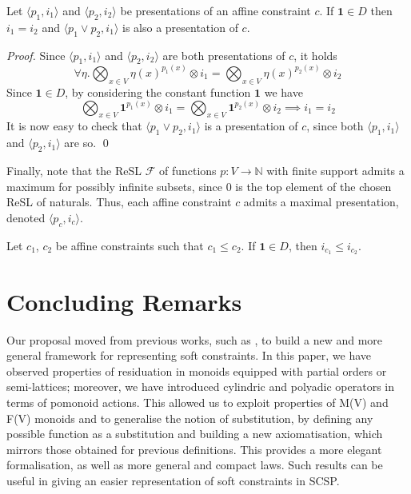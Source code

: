 \documentclass{llncs}
\def\monid{{\mathbf 0}}
\def\1{{\mathbf 1}}
\def\monid{\mathbf{1}}
\begin{document}
\begin{lemma}
Let $\langle p_1, i_1 \rangle$ and  $\langle p_2, i_2 \rangle$
be presentations of an affine constraint $c$. If $\1 \in D$ then
$i_1 = i_2$ and $\langle p_1\vee p_2, i_1\rangle$ is 
also a presentation of $c$.
\end{lemma}
\begin{proof}
Since $\langle p_1, i_1 \rangle$ and $\langle p_2, i_2 \rangle$ are both presentations of $c$, it holds 
\[ 
\forall \eta. \bigotimes_{x \in V} \eta(x)^{p_1(x)} \otimes i_1 = \bigotimes_{x \in V} \eta(x)^{p_2(x)} \otimes i_2 \]
Since $\monid \in D$, by considering the constant function $\monid$ we have
\[ \bigotimes_{x \in V} \monid^{p_1(x)} \otimes i_1 = \bigotimes_{x \in V} \monid^{p_2(x)} \otimes i_2 \implies i_1 = i_2 \]
It is now easy to check that $\langle p_1 \vee p_2, i_1 \rangle$ is a presentation of $c$, since both $\langle p_1, i_1 \rangle$ and $\langle p_2, i_1 \rangle$ are so.
\qed
\end{proof}

Finally, note that the ReSL $\mathcal{F}$ of functions $p: V \rightarrow \mathbb{N}$
with finite support admits a maximum for possibly infinite subsets, since $0$ is the 
top element of the chosen ReSL of naturals.
%
Thus, each affine constraint $c$ admits a maximal presentation, denoted $\langle p_c, i_c\rangle$.

\begin{lemma}
Let $c_1$, $c_2$ be affine constraints
such that $c_1 \leq c_2$.
If $\1 \in D$, then $i_{c_1} \leq i_{c_2}$.
\end{lemma}

\section{Concluding Remarks}\label{sec:conclusion}
Our proposal moved from previous works, such as \cite{ipl17,jlamp17}, to build a new and more general
framework for representing soft constraints. In this paper, we have observed properties of residuation
in monoids equipped with partial orders or semi-lattices; moreover, we have introduced cylindric
and polyadic operators in terms of pomonoid actions. This allowed us to exploit
properties of M(V) and F(V) monoids and to generalise the notion of substitution,
by defining any possible function as a substitution and building a new axiomatisation,
which mirrors those obtained for previous definitions.
This provides a more elegant formalisation, as well as more general and compact laws.
Such results can be useful in giving an easier representation of soft constraints in SCSP.
\end{document}
